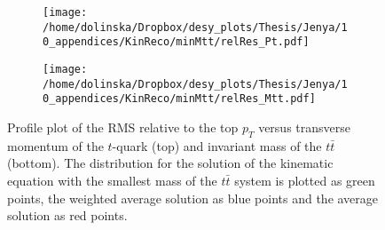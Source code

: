 \begin{figure}[h]
\centering
\begin{subfigure}
  \centering
  \texttt{[image: /home/dolinska/Dropbox/desy\_plots/Thesis/Jenya/10\_appendices/KinReco/minMtt/relRes\_Pt.pdf]}
\end{subfigure}
\begin{subfigure}
  \centering
  \texttt{[image: /home/dolinska/Dropbox/desy\_plots/Thesis/Jenya/10\_appendices/KinReco/minMtt/relRes\_Mtt.pdf]}
\end{subfigure}
\caption{Profile plot of the RMS relative to the top $p_{T}$ versus transverse momentum of the $t$-quark (top) and invariant mass of the $t\bar{t}$ (bottom). The distribution for the
         solution of the kinematic equation with the smallest mass of the $t\bar{t}$ system is plotted as green points, the weighted average solution as blue points and the average 
         solution as red points.}
\label{fig:Absvs}
\end{figure}
